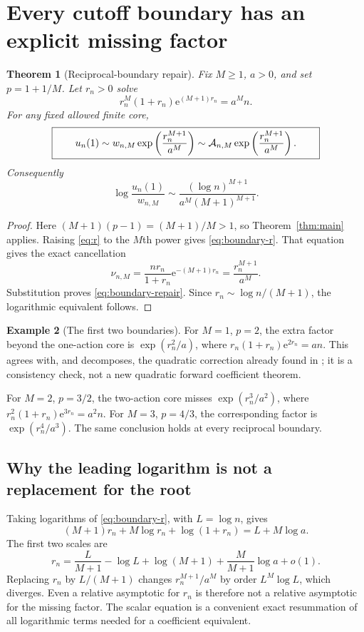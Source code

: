 \documentclass[11pt,a4paper]{article}
\numberwithin{equation}{section}
\newtheorem{theorem}{Theorem}[section]
\theoremstyle{definition}
\newtheorem{example}[theorem]{Example}
\theoremstyle{remark}
\newcommand{\ee}{\mathrm e}\newcommand{\dd}{\mathrm d}
\begin{document}
\section{Every cutoff boundary has an explicit missing factor}
\label{sec:boundary}
\begin{theorem}[Reciprocal-boundary repair]
\label{thm:boundary}
Fix $M\ge1$, $a>0$, and set $p=1+1/M$. Let $r_n>0$ solve
\begin{equation}
 r_n^M(1+r_n)\ee^{(M+1)r_n}=a^M n.
 \label{eq:boundary-r}
\end{equation}
For any fixed allowed finite core,
\begin{equation}
 \boxed{\qquad
 u_n(1)\sim w_{n,M}\exp\left(\frac{r_n^{M+1}}{a^M}\right)
 \sim\mathcal A_{n,M}\exp\left(\frac{r_n^{M+1}}{a^M}\right).
 \qquad}
 \label{eq:boundary-repair}
\end{equation}
Consequently
\begin{equation}
 \log\frac{u_n(1)}{w_{n,M}}
 \sim\frac{(\log n)^{M+1}}{a^M(M+1)^{M+1}}.
 \label{eq:boundary-log}
\end{equation}
\end{theorem}
\begin{proof}
Here $(M+1)(p-1)=(M+1)/M>1$, so Theorem~\ref{thm:main} applies.
Raising \eqref{eq:r} to the $M$th power gives
\eqref{eq:boundary-r}. That equation gives the exact cancellation
\[
 \nu_{n,M}=\frac{nr_n}{1+r_n}\ee^{-(M+1)r_n}
           =\frac{r_n^{M+1}}{a^M}.
\]
Substitution proves \eqref{eq:boundary-repair}. Since
$r_n\sim\log n/(M+1)$, the logarithmic equivalent follows.
\end{proof}

\begin{example}[The first two boundaries]
For $M=1$, $p=2$, the extra factor beyond the one-action core is
$\exp(r_n^2/a)$, where $r_n(1+r_n)\ee^{2r_n}=an$.
This agrees with, and decomposes, the quadratic correction already found
in \cite{finite-core}; it is a consistency check, not a new quadratic
forward coefficient theorem.

For $M=2$, $p=3/2$, the two-action core misses
$\exp(r_n^3/a^2)$, where $r_n^2(1+r_n)\ee^{3r_n}=a^2n$.
For $M=3$, $p=4/3$, the corresponding factor is
$\exp(r_n^4/a^3)$. The same conclusion holds at every reciprocal boundary.
\end{example}

\subsection{Why the leading logarithm is not a replacement for the root}
Taking logarithms of \eqref{eq:boundary-r}, with $L=\log n$, gives
\[
 (M+1)r_n+M\log r_n+\log(1+r_n)=L+M\log a.
\]
The first two scales are
\begin{equation}
 r_n=\frac{L}{M+1}-\log L+\log(M+1)
             +\frac{M}{M+1}\log a+o(1).
 \label{eq:r-expansion}
\end{equation}
Replacing $r_n$ by $L/(M+1)$ changes $r_n^{M+1}/a^M$ by order
$L^M\log L$, which diverges. Even a relative asymptotic for $r_n$ is
therefore not a relative asymptotic for the missing factor.
The scalar equation is a convenient exact resummation of all logarithmic
terms needed for a coefficient equivalent.
\end{document}
